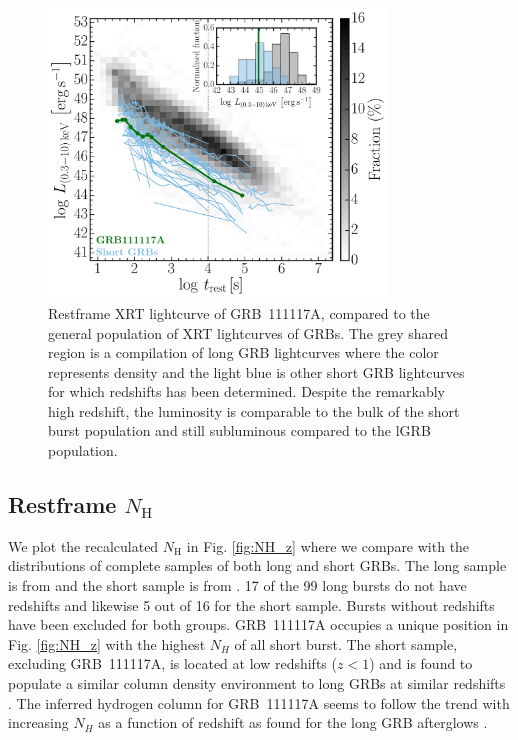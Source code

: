 \documentclass{aa}    %
\begin{document}
\begin{figure}
	\centering
	\includegraphics[width=9cm]{figures/XLC_111117A_rest.pdf}
	\caption{Restframe XRT lightcurve of GRB~111117A, compared to the general population of XRT lightcurves of GRBs. The grey shared region is a compilation of long GRB lightcurves where the color represents density and the light blue is other short GRB lightcurves for which redshifts has been determined. Despite the remarkably high redshift, the luminosity is comparable to the bulk of the short burst population and still subluminous compared to the lGRB population.}
	\label{fig:sxray_lightcurve}
\end{figure}


\subsection{Restframe $N_\mathrm{H}$}

We plot the recalculated $N_\mathrm{H}$ in Fig. \ref{fig:NH_z} where we compare with the
distributions of complete samples of both long and short GRBs. The long sample
is from \citet{Arcodia2016} and the short sample is from \citet{DAvanzo2014a}.
17 of the 99 long bursts do not have redshifts and likewise 5 out of 16 for
the short sample. Bursts without redshifts have been excluded for both groups.
GRB~111117A occupies a unique position in Fig. \ref{fig:NH_z} with the highest
$N_H$ of all short burst. The short sample, excluding GRB~111117A, is located at
low redshifts ($z < 1$) and is found to populate a similar column density
environment to long GRBs at similar redshifts \citep{DAvanzo2014a}. The inferred
hydrogen column for GRB~111117A seems to follow the trend with increasing $N_H$
as a function of redshift as found for the long GRB afterglows \citep{Arcodia2016}.
\end{document}
